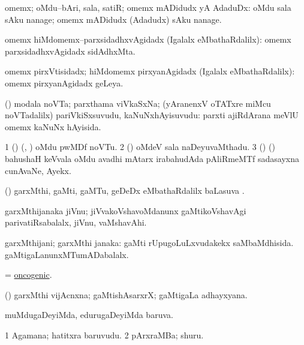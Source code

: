 \bentry
{}
\gl{\nA}
\bmng
omemx; oMdu--bAri, sala, satiR; omemx mADidudx yA AdaduDx:  oMdu sala sAku nanage; omemx mADidudx (Adadudx) sAku nanage. 
\emng
\eentry

\bentry
{}
\gl{\gu}
\bmng
omemx hiMdomemx--parxsidadhxvAgidadx (Igalalx eMbathaRdalilx):  omemx parxsidadhxvAgidadx sidAdhxMta. 
\emng
\eentry

\bentry
{}
\gl{\gu}
\bmng
omemx pirxVtisidadx; hiMdomemx pirxyanAgidadx (Igalalx eMbathaRdalilx):  omemx pirxyanAgidadx geLeya. 
\emng
\eentry

\bentry
{}
\gl{\nA}
\bmng
(\AmA) modala noVTa; parxthama viVkaSxNa; (yAranenxV oTATxre miMcu noVTadalilx) pariVkiSxsuvudu, kaNuNxhAyisuvudu:  parxti ajiRdArana meVlU omemx kaNuNx hAyisida. 
\emng
\eentry

\bentry
{}
\gl{\nA}
\bmng
\bnum
\num{1} (\birx) (\ca, \ashi) oMdu pwMDf noVTu. 
\num{2} (\AmA) oMdeV sala naDeyuvaMthadu. 
\num{3} (\AseTxrXV) (\AmA) bahushaH keVvala oMdu avadhi mAtarx irabahudAda pAliRmeMTf sadasayxna cunAvaNe, Ayekx. 
\enum
\emng
\eentry

\bentry
{}
\gl{\sapUpa}
\bmng
(\veYshA) garxMthi, gaMti, gaMTu, geDeDx eMbathaRdalilx baLasuva \sapUpa. 
\emng
\eentry

\bentry
{}
\gl{\nA}
\bmng
garxMthijanaka jiVnu; jiVvakoVshavoMdanunx gaMtikoVshavAgi parivatiRsabalalx, jiVnu, vaMshavAhi. 
\emng
\eentry

\bentry
{}
\gl{\gu}
\bmng
garxMthijani; garxMthi janaka: 
\banum
{} gaMti rUpugoLuLxvudakekx saMbaMdhisida. 
 gaMtigaLanunxMTumADabalalx. 
\eanum
\emng
\eentry

\bentry
{}
\gl{\gu}
\bmng
= \hyperlink{oncogenic}{oncogenic}. 
\emng
\eentry

\bentry
{}
\gl{\nA}
\bmng
(\veYshA) garxMthi vijAcnxna; gaMtishAsarxrX; gaMtigaLa adhayxyana. 
\emng
\eentry

\bentry
{}
\gl{\gu}
\bmng
muMdugaDeyiMda, edurugaDeyiMda baruva. 
\emng
\eentry

\bentry
{}
\gl{\nA}
\bmng
\bnum
\num{1} Agamana; hatitxra baruvudu. 
\num{2} pArxraMBa; shuru. 
\enum
\emng
\eentry

